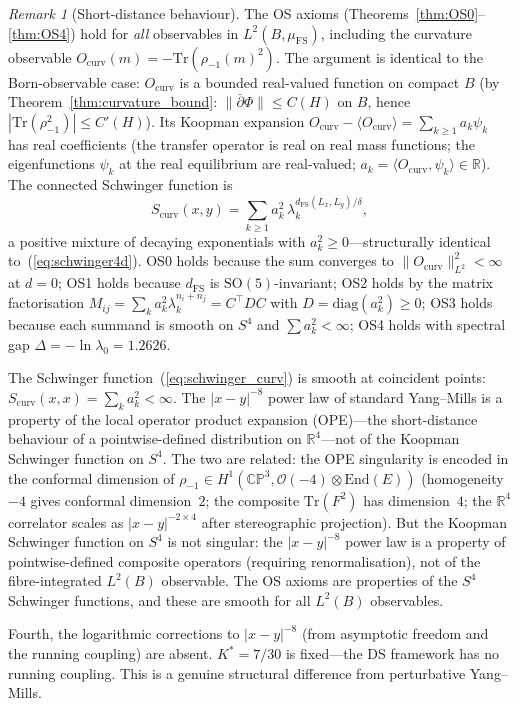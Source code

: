 \documentclass[11pt,a4paper]{article}
\theoremstyle{definition}
\theoremstyle{remark}
\newtheorem{remark}[theorem]{Remark}
\newcommand{\CP}{\mathbb{CP}}
\newcommand{\R}{\mathbb{R}}
\newcommand{\dbar}{\bar{\partial}}
\newcommand{\Tr}{\mathrm{Tr}}
\begin{document}
\begin{remark}[Short-distance behaviour]
The OS axioms (Theorems~\ref{thm:OS0}--\ref{thm:OS4}) hold for \emph{all} observables in $L^2(B,\mu_{\mathrm{FS}})$, including the curvature observable $O_{\mathrm{curv}}(m)=-\Tr(\rho_{-1}(m)^2)$. The argument is identical to the Born-observable case: $O_{\mathrm{curv}}$ is a bounded real-valued function on compact $B$ (by Theorem~\ref{thm:curvature_bound}: $\|\dbar\Phi\|\leq C(H)$ on $B$, hence $|\Tr(\rho_{-1}^2)|\leq C'(H)$). Its Koopman expansion $O_{\mathrm{curv}}-\langle O_{\mathrm{curv}}\rangle=\sum_{k\geq 1}a_k\psi_k$ has real coefficients (the transfer operator is real on real mass functions; the eigenfunctions $\psi_k$ at the real equilibrium are real-valued; $a_k=\langle O_{\mathrm{curv}},\psi_k\rangle\in\R$). The connected Schwinger function is
\begin{equation}\label{eq:schwinger_curv}
S_{\mathrm{curv}}(x,y)=\sum_{k\geq 1}a_k^2\,\lambda_k^{d_{\mathrm{FS}}(L_x,L_y)/\delta},
\end{equation}
a positive mixture of decaying exponentials with $a_k^2\geq 0$---structurally identical to~(\ref{eq:schwinger4d}). OS0 holds because the sum converges to $\|O_{\mathrm{curv}}\|_{L^2}^2<\infty$ at $d=0$; OS1 holds because $d_{\mathrm{FS}}$ is $\mathrm{SO}(5)$-invariant; OS2 holds by the matrix factorisation $M_{ij}=\sum_k a_k^2\lambda_k^{n_i+n_j}=C^\top DC$ with $D=\mathrm{diag}(a_k^2)\geq 0$; OS3 holds because each summand is smooth on $S^4$ and $\sum a_k^2<\infty$; OS4 holds with spectral gap $\Delta=-\ln\lambda_0=1.2626$.

The Schwinger function~(\ref{eq:schwinger_curv}) is smooth at coincident points: $S_{\mathrm{curv}}(x,x)=\sum_k a_k^2<\infty$. The $|x-y|^{-8}$ power law of standard Yang--Mills is a property of the local operator product expansion (OPE)---the short-distance behaviour of a pointwise-defined distribution on $\R^4$---not of the Koopman Schwinger function on $S^4$. The two are related: the OPE singularity is encoded in the conformal dimension of $\rho_{-1}\in H^1(\CP^3,\mathcal{O}(-4)\otimes\mathrm{End}(E))$ (homogeneity $-4$ gives conformal dimension~$2$; the composite $\Tr(F^2)$ has dimension~$4$; the $\R^4$ correlator scales as $|x-y|^{-2\times 4}$ after stereographic projection). But the Koopman Schwinger function on $S^4$ is not singular: the $|x-y|^{-8}$ power law is a property of pointwise-defined composite operators (requiring renormalisation), not of the fibre-integrated $L^2(B)$ observable. The OS axioms are properties of the $S^4$ Schwinger functions, and these are smooth for all $L^2(B)$ observables.

Fourth, the logarithmic corrections to $|x-y|^{-8}$ (from asymptotic freedom and the running coupling) are absent. $K^*=7/30$ is fixed---the DS framework has no running coupling. This is a genuine structural difference from perturbative Yang--Mills.
\end{remark}
\end{document}

